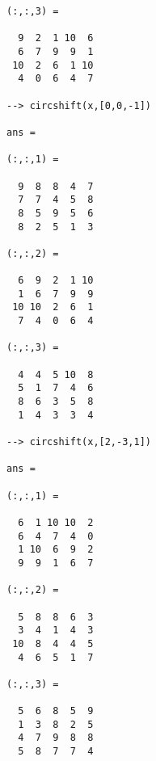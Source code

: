 \begin{verbatim}
(:,:,3) = 

  9  2  1 10  6 
  6  7  9  9  1 
 10  2  6  1 10 
  4  0  6  4  7 

--> circshift(x,[0,0,-1])

ans = 

(:,:,1) = 

  9  8  8  4  7 
  7  7  4  5  8 
  8  5  9  5  6 
  8  2  5  1  3 

(:,:,2) = 

  6  9  2  1 10 
  1  6  7  9  9 
 10 10  2  6  1 
  7  4  0  6  4 

(:,:,3) = 

  4  4  5 10  8 
  5  1  7  4  6 
  8  6  3  5  8 
  1  4  3  3  4 

--> circshift(x,[2,-3,1])

ans = 

(:,:,1) = 

  6  1 10 10  2 
  6  4  7  4  0 
  1 10  6  9  2 
  9  9  1  6  7 

(:,:,2) = 

  5  8  8  6  3 
  3  4  1  4  3 
 10  8  4  4  5 
  4  6  5  1  7 

(:,:,3) = 

  5  6  8  5  9 
  1  3  8  2  5 
  4  7  9  8  8 
  5  8  7  7  4 
\end{verbatim}
